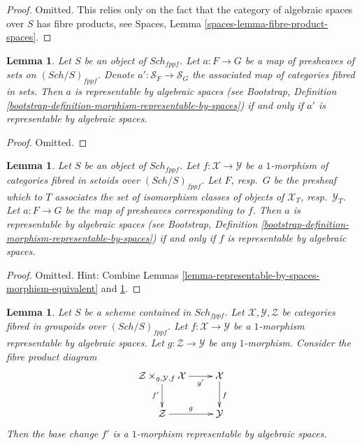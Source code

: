 \documentclass{stacks-project}
\theoremstyle{plain}
\newtheorem{lemma}[subsection]{Lemma}
\theoremstyle{definition}
\theoremstyle{remark}
\numberwithin{equation}{subsection}
\def\Sch{\mathit{Sch}}
\begin{document}
\begin{proof}
Omitted. This relies only on the fact that
the category of algebraic spaces over $S$ has fibre products,
see Spaces, Lemma \ref{spaces-lemma-fibre-product-spaces}.
\end{proof}

\begin{lemma}
\label{lemma-map-presheaves-representable-by-algebraic-spaces}
Let $S$ be an object of $\Sch_{fppf}$.
Let $a : F \to G$ be a map of presheaves of sets on $(\Sch/S)_{fppf}$.
Denote $a' : \mathcal{S}_F  \to \mathcal{S}_G$ the associated
map of categories fibred in sets.
Then $a$ is representable by algebraic spaces (see
Bootstrap,
Definition \ref{bootstrap-definition-morphism-representable-by-spaces})
if and only if $a'$ is representable by algebraic spaces.
\end{lemma}

\begin{proof}
Omitted.
\end{proof}

\begin{lemma}
\label{lemma-map-fibred-setoids-representable-algebraic-spaces}
Let $S$ be an object of $\Sch_{fppf}$.
Let $f : \mathcal{X} \to \mathcal{Y}$ be a $1$-morphism of
categories fibred in setoids over $(\Sch/S)_{fppf}$.
Let $F$, resp.\ $G$ be the presheaf which to $T$ associates
the set of isomorphism classes of objects of
$\mathcal{X}_T$, resp.\ $\mathcal{Y}_T$.
Let $a : F \to G$ be the map of presheaves corresponding to $f$.
Then $a$ is representable by algebraic spaces (see
Bootstrap,
Definition \ref{bootstrap-definition-morphism-representable-by-spaces})
if and only if $f$ is representable by algebraic spaces.
\end{lemma}

\begin{proof}
Omitted. Hint: Combine
Lemmas \ref{lemma-representable-by-spaces-morphism-equivalent}
and \ref{lemma-map-presheaves-representable-by-algebraic-spaces}.
\end{proof}

\begin{lemma}
\label{lemma-base-change-representable-by-spaces}
Let $S$ be a scheme contained in $\Sch_{fppf}$.
Let $\mathcal{X}, \mathcal{Y}, \mathcal{Z}$
be categories fibred in groupoids over $(\Sch/S)_{fppf}$.
Let $f : \mathcal{X} \to \mathcal{Y}$ be a $1$-morphism
representable by algebraic spaces.
Let $g : \mathcal{Z} \to \mathcal{Y}$ be any $1$-morphism.
Consider the fibre product diagram
$$
\xymatrix{
\mathcal{Z} \times_{g, \mathcal{Y}, f} \mathcal{X} \ar[r]_-{g'} \ar[d]_{f'} &
\mathcal{X} \ar[d]^f \\
\mathcal{Z} \ar[r]^g & \mathcal{Y}
}
$$
Then the base change $f'$ is a $1$-morphism representable by
algebraic spaces.
\end{lemma}
\end{document}
